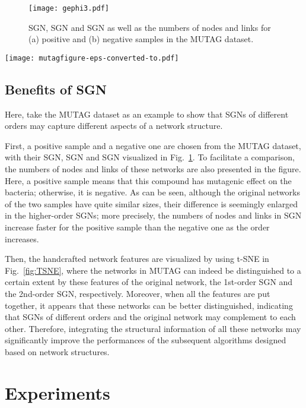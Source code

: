 \documentclass[10pt,journal,compsoc]{IEEEtran}
\begin{document}
\begin{figure}[!t]
  \centering
  \texttt{[image: gephi3.pdf]}
  \caption{SGN, SGN and SGN as well as the numbers of nodes and links for (a) positive and (b) negative samples in the MUTAG dataset.}
  \label{gephi}
\end{figure}

\begin{figure*}[!t]
	\centering
	\texttt{[image: mutagfigure-eps-converted-to.pdf]}
	\caption{The t-SNE visualization of handcrafted network features. The same color of points represent the same class of networks in MUTAG.}
	\label{fig:TSNE}
\end{figure*}

\subsection{Benefits of SGN}

Here, take the MUTAG dataset as an example to show that SGNs of different orders may capture different aspects of a network structure.

First, a positive sample and a negative one are chosen from the MUTAG dataset, with their SGN, SGN and SGN visualized in Fig.~\ref{gephi}. To facilitate a comparison, the numbers of nodes and links of these networks are also presented in the figure. Here, a positive sample means that this compound has mutagenic effect on the bacteria; otherwise, it is negative. As can be seen, although the original networks of the two samples have quite similar sizes, their difference is seemingly enlarged in the higher-order SGNs; more precisely, the numbers of nodes and links in SGN increase faster for the positive sample than the negative one as the order increases.

Then, the handcrafted network features are visualized by using t-SNE in Fig.~\ref{fig:TSNE}, where the networks in MUTAG can indeed be distinguished to a certain extent by these features of the original network, the 1st-order SGN and the 2nd-order SGN, respectively. Moreover, when all the features are put together, it appears that these networks can be better distinguished, indicating that SGNs of different orders and the original network may complement to each other. Therefore, integrating the structural information of all these networks may significantly improve the performances of the subsequent algorithms designed based on network structures.

\section{Experiments}\label{sec:Exp}
\end{document}
